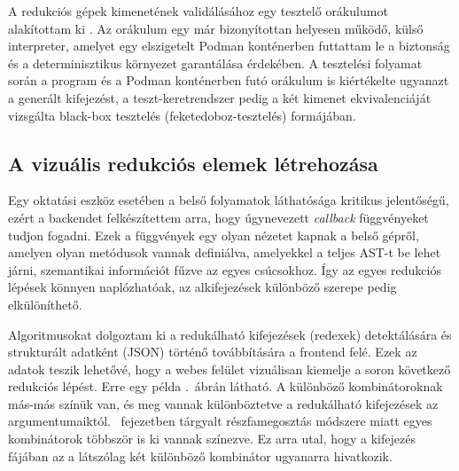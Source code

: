 \documentclass[a4paper,oneside,12pt]{article}
\begin{document}
A redukciós gépek kimenetének validálásához egy tesztelő orákulumot alakítottam ki \cite{howdenTheoreticalEmpiricalStudies1978}. Az orákulum egy már bizonyítottan helyesen működő, külső interpreter, amelyet egy elszigetelt Podman konténerben futtattam le a biztonság és a determinisztikus környezet garantálása érdekében. A tesztelési folyamat során a program és a Podman konténerben futó orákulum is kiértékelte ugyanazt a generált kifejezést, a teszt-keretrendszer pedig a két kimenet ekvivalenciáját vizsgálta \foreignlanguage{english}{black-box} tesztelés (feketedoboz-tesztelés) formájában.


\subsection{A vizuális redukciós elemek létrehozása}
\label{sec:a-viz-reduk-elemek-letrehoz}

Egy oktatási eszköz esetében a belső folyamatok láthatósága kritikus jelentőségű, ezért a backendet felkészítettem arra, hogy úgynevezett \emph{\foreignlanguage{english}{callback}} függvényeket tudjon fogadni. Ezek a függvények egy olyan nézetet kapnak a belső gépről, amelyen olyan metódusok vannak definiálva, amelyekkel a teljes AST-t be lehet járni, szemantikai információt fűzve az egyes csúcsokhoz. Így az egyes redukciós lépések könnyen naplózhatóak, az alkifejezések különböző szerepe pedig elkülöníthető.

Algoritmusokat dolgoztam ki a redukálható kifejezések (redexek) detektálására és strukturált adatként (JSON) történő továbbítására a frontend felé. Ezek az adatok teszik lehetővé, hogy a webes felület vizuálisan kiemelje a soron következő redukciós lépést. Erre egy példa .~ábrán látható. A különböző kombinátoroknak más-más színük van, és meg vannak különböztetve a redukálható kifejezések az argumentumaiktól. ~fejezetben tárgyalt részfamegosztás módszere miatt egyes kombinátorok többször is ki vannak színezve. Ez arra utal, hogy a kifejezés fájában az a látszólag két különböző kombinátor ugyanarra hivatkozik.
\end{document}
